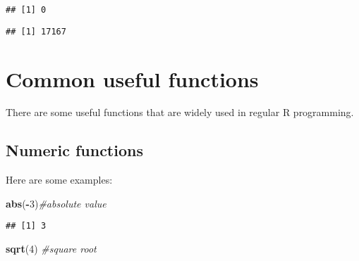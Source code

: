 \documentclass[]{book}
\newenvironment{Shaded}{\begin{snugshade}}{\end{snugshade}}
\newcommand{\KeywordTok}[1]{\textcolor[rgb]{0.13,0.29,0.53}{\textbf{#1}}}
\newcommand{\DecValTok}[1]{\textcolor[rgb]{0.00,0.00,0.81}{#1}}
\newcommand{\StringTok}[1]{\textcolor[rgb]{0.31,0.60,0.02}{#1}}
\newcommand{\CommentTok}[1]{\textcolor[rgb]{0.56,0.35,0.01}{\textit{#1}}}
\newcommand{\OperatorTok}[1]{\textcolor[rgb]{0.81,0.36,0.00}{\textbf{#1}}}
\newcommand{\NormalTok}[1]{#1}
\theoremstyle{definition}
\theoremstyle{definition}
\theoremstyle{definition}
\theoremstyle{remark}
\begin{document}
\begin{Shaded}
\end{Shaded}

\begin{verbatim}
## [1] 0
\end{verbatim}

\begin{Shaded}
\end{Shaded}

\begin{verbatim}
## [1] 17167
\end{verbatim}

\section{Common useful functions}\label{common-useful-functions}

There are some useful functions that are widely used in regular R
programming.

\subsection{Numeric functions}\label{numeric-functions}

Here are some examples:

\begin{Shaded}
\begin{Highlighting}[]
\KeywordTok{abs}\NormalTok{(}\OperatorTok{-}\DecValTok{3}\NormalTok{)}\CommentTok{#absolute value}
\end{Highlighting}
\end{Shaded}

\begin{verbatim}
## [1] 3
\end{verbatim}

\begin{Shaded}
\begin{Highlighting}[]
\KeywordTok{sqrt}\NormalTok{(}\DecValTok{4}\NormalTok{) }\CommentTok{#square root}
\end{Highlighting}
\end{Shaded}
\end{document}
